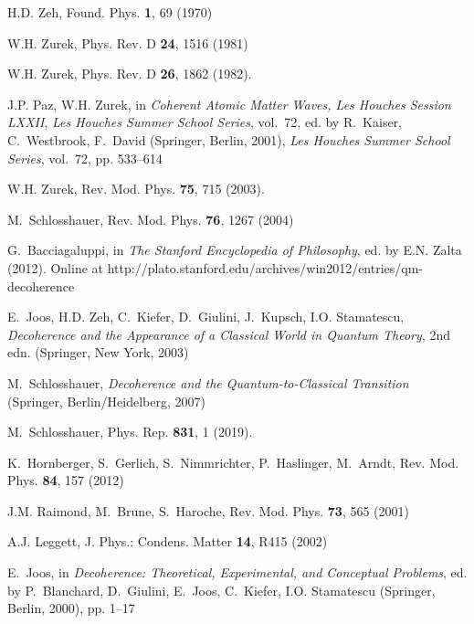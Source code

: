 \documentclass[aps,pra,reprint,amsmath,amssymb,showpacs,nofootinbib,floatfix,onecolumn,12pt]{revtex4-1}
\begin{document}
\begin{thebibliography}{100}

H.D. Zeh, Found. Phys. \textbf{1}, 69 (1970)

W.H. Zurek, Phys. Rev. D \textbf{24}, 1516 (1981)

W.H. Zurek, Phys. Rev. D \textbf{26}, 1862 (1982).
\newblock {}

J.P. Paz, W.H. Zurek, in \emph{Coherent Atomic Matter Waves, Les Houches
  Session LXXII}, \emph{Les Houches Summer School Series}, vol.~72, ed. by
  R.~Kaiser, C.~Westbrook, F.~David (Springer, Berlin, 2001), \emph{Les Houches
  Summer School Series}, vol.~72, pp. 533--614

W.H. Zurek, Rev. Mod. Phys. \textbf{75}, 715 (2003).
\newblock {}

M.~Schlosshauer, Rev. Mod. Phys. \textbf{76}, 1267 (2004)

G.~Bacciagaluppi, in \emph{The Stanford Encyclopedia of Philosophy}, ed. by
  E.N. Zalta (2012).
\newblock Online at
  http://plato.stanford.edu/archives/win2012/entries/qm-decoherence

E.~Joos, H.D. Zeh, C.~Kiefer, D.~Giulini, J.~Kupsch, I.O. Stamatescu,
  \emph{Decoherence and the Appearance of a Classical World in Quantum Theory},
  2nd edn. (Springer, New York, 2003)

M.~Schlosshauer, \emph{Decoherence and the Quantum-to-Classical Transition}
  (Springer, Berlin/Heidelberg, 2007)

M.~Schlosshauer, Phys. Rep. \textbf{831}, 1 (2019).
\newblock {}

K.~Hornberger, S.~Gerlich, S.~Nimmrichter, P.~Haslinger, M.~Arndt, Rev. Mod.
  Phys. \textbf{84}, 157 (2012)

J.M. Raimond, M.~Brune, S.~Haroche, Rev. Mod. Phys. \textbf{73}, 565 (2001)

A.J. Leggett, J. Phys.: Condens. Matter \textbf{14}, R415 (2002)

E.~Joos, in \emph{Decoherence: Theoretical, Experimental, and Conceptual
  Problems}, ed. by P.~Blanchard, D.~Giulini, E.~Joos, C.~Kiefer, I.O.
  Stamatescu (Springer, Berlin, 2000), pp. 1--17


\end{thebibliography}
\end{document}

